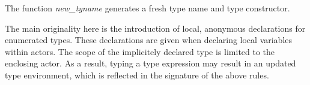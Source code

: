 The function \emph{new\_tyname} generates a fresh type name and type constructor.


{\TE \vdash {} \gives \tau}

\medskip
The main originality here is the introduction of local, anonymous declarations for enumerated types.
These declarations are given when declaring local variables within actors. The scope of the
implicitely declared type is limited to the enclosing actor. As a result, typing a type expression
may result in an updated type environment, which is reflected in the signature of the above rules.


